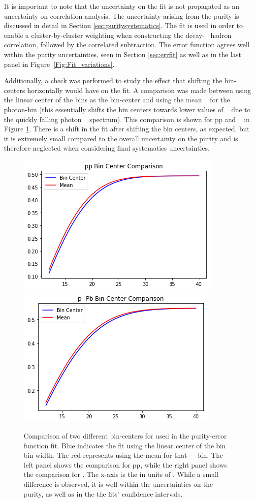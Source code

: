 It is important to note that the uncertainty on the fit is not propagated as an uncertainty on correlation analysis. The uncertainty arising from the purity is discussed in detail in Section \ref{sec:puritysystematics}. The fit is used in order to enable a cluster-by-cluster weighting when constructing the decay-\gammaiso~ hadron correlation, followed by the correlated subtraction. The error function agrees well within the purity uncertainties, seen in Section \ref{sec:errfit} as well as in the last panel in Figure~\ref{Fig:Fit_variations}.

Additionally, a check was performed to study the effect that shifting the bin-centers horizontally would have on the fit. A comparison was made between using the linear center of the bins as the bin-center and using the mean \pt~ for the photon-bin (this essentially shifts the bin centers towards lower values of \pt~ due to the quickly falling photon \pt~ spectrum). This comparison is shown for pp and \pPb~ in Figure \ref{Fig:Error_Fit_Mean_Center}. There is a shift in the fit after shifting the bin centers, as expected, but it is extremely small compared to the overall uncertainty on the purity and is therefore neglected when considering final systematics uncertainties.

\begin{figure}
    \centering
    \includegraphics[width=.49\textwidth]{Checks_Systematics/pp_MeanVsBinCenter.png}
    \includegraphics[width=.49\textwidth]{Checks_Systematics/pPb_Compare.png}
    \caption{Comparison of two different bin-centers for used in the purity-error function fit. Blue indicates the fit using the linear center of the bin \pt bin-width. The red represents using the mean \pt for that \gammaiso~ \pt-bin. The left panel shows the comparison for pp, while the right panel shows the comparison for \pPb. The x-axis is the \gammaiso \pt in units of \GeVc. While a small difference is observed, it is well within the uncertainties on the purity, as well as in the the fits' confidence intervals.}
    \label{Fig:Error_Fit_Mean_Center}
\end{figure}

